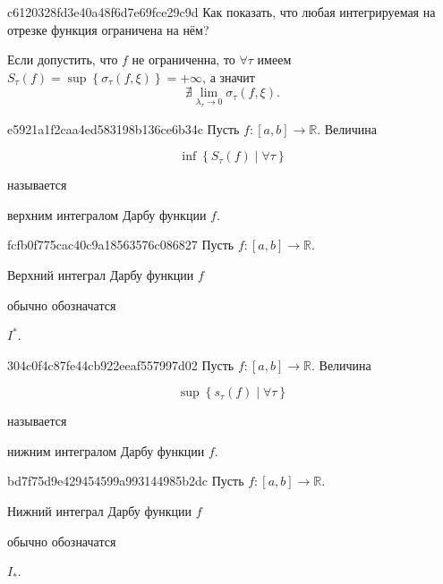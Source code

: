 \begin{note}{c6120328fd3e40a48f6d7e69fce29c9d}
    Как показать, что любая интегрируемая на отрезке функция ограничена на нём?

    \begin{cloze}{1}
        Если допустить, что \({ f }\) не ограниченна, то \({ \forall \tau }\) имеем \({ S_\tau (f) = \sup \left\{ \sigma_\tau (f, \xi) \right\} = +\infty }\), а значит
        \[
            \nexists \lim_{\lambda_\tau \to 0} \sigma_\tau (f, \xi).
        \]
    \end{cloze}
\end{note}

\begin{note}{e5921a1f2caa4ed583198b136ce6b34c}
    Пусть \({ f : \left[ a, b \right] \to \mathbb R }\). Величина
    \begin{icloze}{1}
        \[
            \inf \left\{ S_{\tau} (f) \mid \forall \tau \right\}
        \]
    \end{icloze}
    называется \begin{icloze}{2}верхним интегралом Дарбу функции \({ f }\).\end{icloze}
\end{note}

\begin{note}{fcfb0f775cac40c9a18563576c086827}
    Пусть \({ f : \left[ a, b \right] \to \mathbb R }\). \begin{icloze}{1}Верхний интеграл Дарбу функции \({ f }\)\end{icloze} обычно обозначатся \begin{icloze}{2}\( I^{*} \).\end{icloze}
\end{note}

\begin{note}{304c0f4c87fe44cb922eeaf557997d02}
    Пусть \({ f : \left[ a, b \right] \to \mathbb R }\). Величина
    \begin{icloze}{1}
        \[
            \sup \left\{ s_{\tau} (f) \mid \forall \tau \right\}
        \]
    \end{icloze}
    называется \begin{icloze}{2}нижним интегралом Дарбу функции \({ f }\).\end{icloze}
\end{note}

\begin{note}{bd7f75d9e429454599a993144985b2dc}
    Пусть \({ f : \left[ a, b \right] \to \mathbb R }\). \begin{icloze}{1}Нижний интеграл Дарбу функции \({ f }\)\end{icloze} обычно обозначатся \begin{icloze}{2}\( I_{*} \).\end{icloze}
\end{note}

